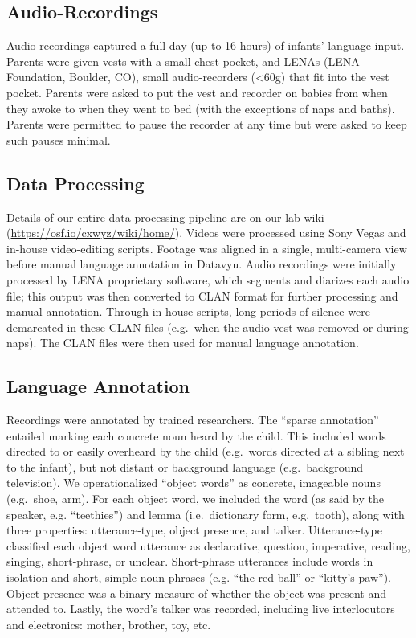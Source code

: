 \documentclass[floatsintext,man]{apa6}
\theoremstyle{definition}
\theoremstyle{definition}
\theoremstyle{definition}
\theoremstyle{remark}
\begin{document}
\hypertarget{audio-recordings}{%
\subsection{Audio-Recordings}\label{audio-recordings}}

Audio-recordings captured a full day (up to 16 hours) of infants'
language input. Parents were given vests with a small chest-pocket, and
LENAs (LENA Foundation, Boulder, CO), small audio-recorders
(\textless{}60g) that fit into the vest pocket. Parents were asked to
put the vest and recorder on babies from when they awoke to when they
went to bed (with the exceptions of naps and baths). Parents were
permitted to pause the recorder at any time but were asked to keep such
pauses minimal.

\hypertarget{data-processing}{%
\subsection{Data Processing}\label{data-processing}}

Details of our entire data processing pipeline are on our lab wiki
(\url{https://osf.io/cxwyz/wiki/home/}). Videos were processed using
Sony Vegas and in-house video-editing scripts. Footage was aligned in a
single, multi-camera view before manual language annotation in Datavyu.
Audio recordings were initially processed by LENA proprietary software,
which segments and diarizes each audio file; this output was then
converted to CLAN format for further processing and manual annotation.
Through in-house scripts, long periods of silence were demarcated in
these CLAN files (e.g.~when the audio vest was removed or during naps).
The CLAN files were then used for manual language annotation.

\hypertarget{language-annotation}{%
\subsection{Language Annotation}\label{language-annotation}}

Recordings were annotated by trained researchers. The \enquote{sparse
annotation} entailed marking each concrete noun heard by the child. This
included words directed to or easily overheard by the child (e.g.~words
directed at a sibling next to the infant), but not distant or background
language (e.g.~background television). We operationalized
\enquote{object words} as concrete, imageable nouns (e.g.~shoe, arm).
For each object word, we included the word (as said by the speaker, e.g.
\enquote{teethies}) and lemma (i.e.~dictionary form, e.g.~tooth), along
with three properties: utterance-type, object presence, and talker.
Utterance-type classified each object word utterance as declarative,
question, imperative, reading, singing, short-phrase, or unclear.
Short-phrase utterances include words in isolation and short, simple
noun phrases (e.g. \enquote{the red ball} or \enquote{kitty's paw}).
Object-presence was a binary measure of whether the object was present
and attended to. Lastly, the word's talker was recorded, including live
interlocutors and electronics: mother, brother, toy, etc.
\end{document}
